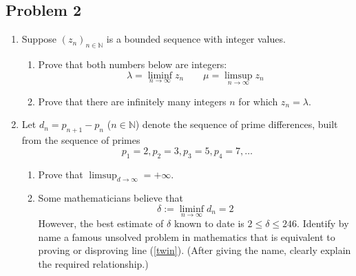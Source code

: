 \documentclass{article}
\newcommand{\N}{{\mathbb N}}
\begin{document}
\subsection*{Problem 2}
{\it
\begin{enumerate}
	\item Suppose $(z_n)_{n\in\N}$ is a bounded sequence with integer values.
	\begin{enumerate}
		\item Prove that both numbers below are integers:
			\[
				\lambda = \liminf_{n\to\infty} z_n \qquad
				\mu = \limsup_{n\to\infty} z_n
			\]
		\item Prove that there are infinitely many integers
			$n$ for which $z_n = \lambda$.
	\end{enumerate}
	\item Let $d_n = p_{n+1} - p_n$ ($n \in \N$)
		denote the sequence of prime differences,
		built from the sequence of primes
		\[
			p_1 = 2, p_2 = 3, p_3 = 5, p_4 = 7, \dots
		\]
	\begin{enumerate}
		\item Prove that $\limsup_{d\to\infty} = +\infty$.
		\item Some mathematicians believe that
			\begin{equation}\label{twin}
				\delta := \liminf_{n \to\infty} d_n = 2
			\end{equation}
			However, the best estimate of $\delta$ known to date
			is $2 \leq \delta \leq 246$.
			Identify by name a famous unsolved problem in mathematics
			that is equivalent to proving or disproving line (\ref{twin}).
			(After giving the name, clearly explain the required relationship.)
	\end{enumerate}
\end{enumerate}}
\end{document}
